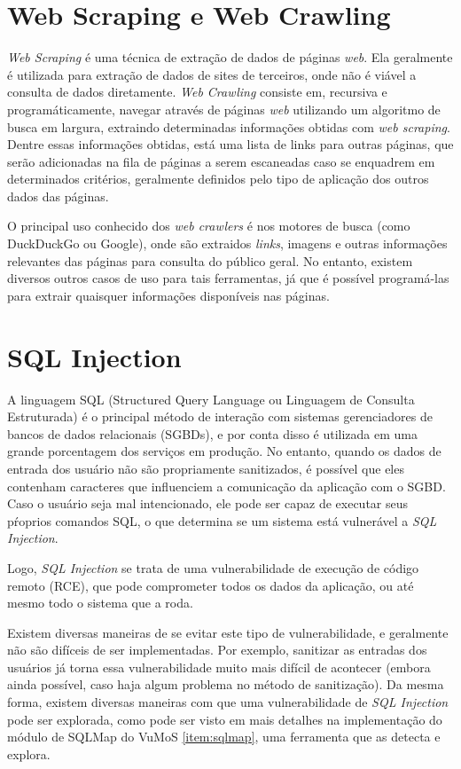 \section{Web Scraping e Web Crawling}

\textit{Web Scraping} é uma técnica de extração de dados de páginas \textit{web}. Ela geralmente é utilizada para extração de dados de sites de terceiros, onde não é viável a consulta de dados diretamente. 
\textit{Web Crawling} consiste em, recursiva e programáticamente, navegar através de páginas \textit{web} utilizando um algoritmo de busca em largura, extraindo determinadas informações obtidas com \textit{web scraping}. Dentre essas informações obtidas, está uma lista de links para outras páginas, que serão adicionadas na fila de páginas a serem escaneadas caso se enquadrem em determinados critérios, geralmente definidos pelo tipo de aplicação dos outros dados das páginas.

O principal uso conhecido dos \textit{web crawlers} é nos motores de busca (como DuckDuckGo ou Google), onde são extraidos \textit{links}, imagens e outras informações relevantes das páginas para consulta do público geral. No entanto, existem diversos outros casos de uso para tais ferramentas, já que é possível programá-las para extrair quaisquer informações disponíveis nas páginas. 

\section{SQL Injection}

A linguagem SQL (Structured Query Language ou Linguagem de Consulta Estruturada) é o principal método de interação com sistemas gerenciadores de bancos de dados relacionais (SGBDs), e por conta disso é utilizada em uma grande porcentagem dos serviços em produção. No entanto, quando os dados de entrada dos usuário não são propriamente sanitizados, é possível que eles contenham caracteres que influenciem a comunicação da aplicação com o SGBD. Caso o usuário seja mal intencionado, ele pode ser capaz de executar seus pŕoprios comandos SQL, o que determina se um sistema está vulnerável a \textit{SQL Injection}. 

Logo, \textit{SQL Injection} se trata de uma vulnerabilidade de execução de código remoto (RCE), que pode comprometer todos os dados da aplicação, ou até mesmo todo o sistema que a roda. 

Existem diversas maneiras de se evitar este tipo de vulnerabilidade, e geralmente não são difíceis de ser implementadas. Por exemplo, sanitizar as entradas dos usuários já torna essa vulnerabilidade muito mais difícil de acontecer (embora ainda possível, caso haja algum problema no método de sanitização). Da mesma forma, existem diversas maneiras com que uma vulnerabilidade de \textit{SQL Injection} pode ser explorada, como pode ser visto em mais detalhes na implementação do módulo de SQLMap do VuMoS \ref{item:sqlmap}, uma ferramenta que as detecta e explora.  